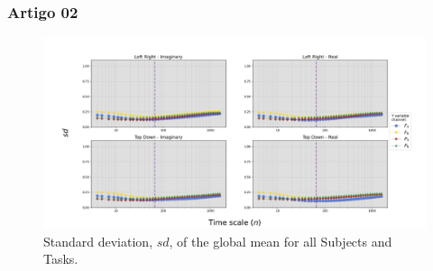 \documentclass[11pt, aspectratio=169]{beamer}
\begin{document}
\begin{frame}
  \frametitle{Artigo 02}

  \begin{figure}[!h]
    \includegraphics[height=.5\paperheight]{../Figures/art_02/Fig9.jpg}
    \caption{Standard deviation, $sd$, of the global mean for all Subjects and Tasks.}
    \label{fig09}
  \end{figure}
\end{frame}
\end{document}
